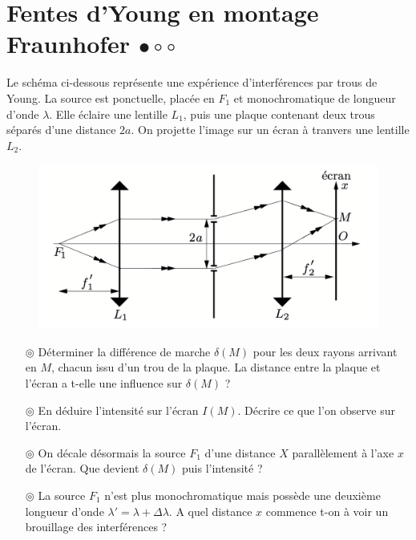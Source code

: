 \documentclass{report}
\begin{document}
\section*{Fentes d'Young en montage Fraunhofer $\bullet\circ\circ$}

Le schéma ci-dessous représente une expérience d’interférences par trous de Young. La source est ponctuelle, placée en $F_1$ et monochromatique de longueur d’onde $\lambda$. Elle éclaire une lentille $L_1$, puis une plaque contenant deux trous séparés d'une distance $2a$. On projette l'image sur un écran à tranvers une lentille $L_2$.

\begin{figure}[h]
\centering
  \includegraphics[scale=0.6]{fraunhofer.png}
\end{figure}

\begin{itemize}

	\item[$\circledcirc$] Déterminer la différence de marche $\delta(M)$ pour les deux rayons arrivant en $M$, chacun issu d'un trou de la plaque. La distance entre la plaque et l'écran a t-elle une influence sur $\delta(M)$ ?
	
	\item[$\circledcirc$] En déduire l'intensité sur l'écran $I(M)$. Décrire ce que l'on observe sur l'écran.
	
	\item[$\circledcirc$] On décale désormais la source $F_1$ d'une distance $X$ parallèlement à l'axe $x$ de l'écran. Que devient $\delta(M)$ puis l'intensité ? 
	
	\item[$\circledcirc$] La source $F_1$ n'est plus monochromatique mais possède une deuxième longueur d'onde $\lambda'=\lambda+\Delta \lambda$. A quel distance $x$ commence t-on à voir un brouillage des interférences ?

\end{itemize}
\end{document}

